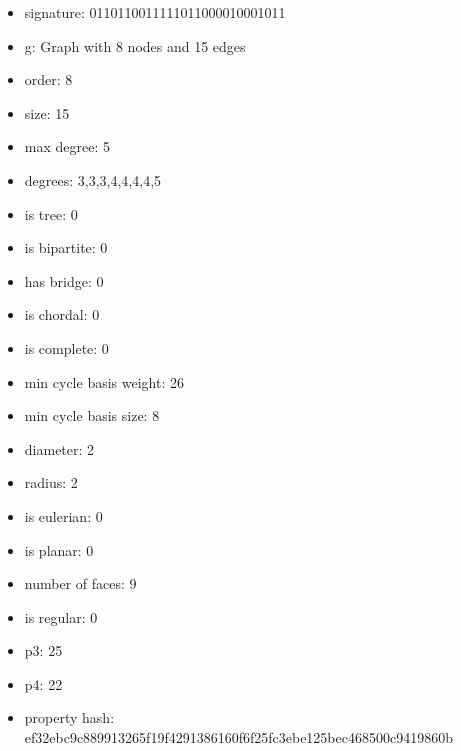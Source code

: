 \begin{itemize}
\item signature: 0110110011111011000010001011
\item g: Graph with 8 nodes and 15 edges
\item order: 8
\item size: 15
\item max degree: 5
\item degrees: 3,3,3,4,4,4,4,5
\item is tree: 0
\item is bipartite: 0
\item has bridge: 0
\item is chordal: 0
\item is complete: 0
\item min cycle basis weight: 26
\item min cycle basis size: 8
\item diameter: 2
\item radius: 2
\item is eulerian: 0
\item is planar: 0
\item number of faces: 9
\item is regular: 0
\item p3: 25
\item p4: 22
\item property hash: ef32ebc9c889913265f19f4291386160f6f25fc3ebe125bec468500c9419860b
\end{itemize}
\newpage
\begin{figure}
\end{figure}
